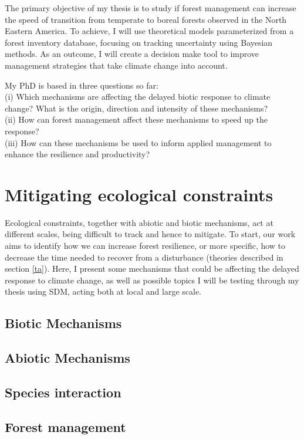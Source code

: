 The primary objective of my thesis is to study if forest management can increase the speed of transition from temperate to boreal forests observed in the North Eastern America.
To achieve, I will use theoretical models parameterized from a forest inventory database, focusing on tracking uncertainty using Bayesian methods.
As an outcome, I will create a decision make tool to improve management strategies that take climate change into account.

My PhD is based in three questions so far: \\
(i) Which mechanisms are affecting the delayed biotic response to climate change? What is the origin, direction and intensity of these mechanisms? \\
(ii) How can forest management affect these mechanisms to speed up the response? \\
(iii) How can these mechanisms be used to inform applied management to enhance the resilience and productivity?

\section{Mitigating ecological constraints}

Ecological constraints, together with abiotic and biotic mechanisms, act at different scales, being difficult to track and hence to mitigate.
To start, our work aims to identify how we can increase forest resilience, or more specific, how to decrease the time needed to recover from a disturbance (theories described in section \ref{ta}).
Here, I present some mechanisms that could be affecting the delayed response to climate change, as well as possible topics I will be testing through my thesis using SDM, acting both at local and large scale.

\subsection{Biotic Mechanisms}

\subsection{Abiotic Mechanisms}

\subsection{Species interaction}

\subsection{Forest management}

